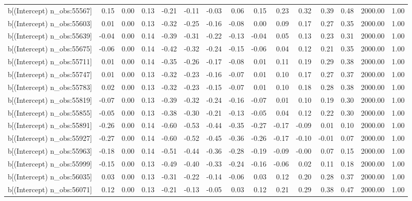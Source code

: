 \begin{table}[ht]
\begin{tabular}{rrrrrrrrrrrrrrr}
  b[(Intercept) n\_obs:55567] & 0.15 & 0.00 & 0.13 & -0.21 & -0.11 & -0.03 & 0.06 & 0.15 & 0.23 & 0.32 & 0.39 & 0.48 & 2000.00 & 1.00 \\ 
  b[(Intercept) n\_obs:55603] & 0.01 & 0.00 & 0.13 & -0.32 & -0.25 & -0.16 & -0.08 & 0.00 & 0.09 & 0.17 & 0.27 & 0.35 & 2000.00 & 1.00 \\ 
  b[(Intercept) n\_obs:55639] & -0.04 & 0.00 & 0.14 & -0.39 & -0.31 & -0.22 & -0.13 & -0.04 & 0.05 & 0.13 & 0.23 & 0.31 & 2000.00 & 1.00 \\ 
  b[(Intercept) n\_obs:55675] & -0.06 & 0.00 & 0.14 & -0.42 & -0.32 & -0.24 & -0.15 & -0.06 & 0.04 & 0.12 & 0.21 & 0.35 & 2000.00 & 1.00 \\ 
  b[(Intercept) n\_obs:55711] & 0.01 & 0.00 & 0.14 & -0.35 & -0.26 & -0.17 & -0.08 & 0.01 & 0.11 & 0.19 & 0.29 & 0.38 & 2000.00 & 1.00 \\ 
  b[(Intercept) n\_obs:55747] & 0.01 & 0.00 & 0.13 & -0.32 & -0.23 & -0.16 & -0.07 & 0.01 & 0.10 & 0.17 & 0.27 & 0.37 & 2000.00 & 1.00 \\ 
  b[(Intercept) n\_obs:55783] & 0.02 & 0.00 & 0.13 & -0.32 & -0.23 & -0.15 & -0.07 & 0.01 & 0.10 & 0.18 & 0.28 & 0.38 & 2000.00 & 1.00 \\ 
  b[(Intercept) n\_obs:55819] & -0.07 & 0.00 & 0.13 & -0.39 & -0.32 & -0.24 & -0.16 & -0.07 & 0.01 & 0.10 & 0.19 & 0.30 & 2000.00 & 1.00 \\ 
  b[(Intercept) n\_obs:55855] & -0.05 & 0.00 & 0.13 & -0.38 & -0.30 & -0.21 & -0.13 & -0.05 & 0.04 & 0.12 & 0.22 & 0.30 & 2000.00 & 1.00 \\ 
  b[(Intercept) n\_obs:55891] & -0.26 & 0.00 & 0.14 & -0.60 & -0.53 & -0.44 & -0.35 & -0.27 & -0.17 & -0.09 & 0.01 & 0.10 & 2000.00 & 1.00 \\ 
  b[(Intercept) n\_obs:55927] & -0.27 & 0.00 & 0.14 & -0.60 & -0.52 & -0.45 & -0.36 & -0.26 & -0.17 & -0.10 & -0.01 & 0.07 & 2000.00 & 1.00 \\ 
  b[(Intercept) n\_obs:55963] & -0.18 & 0.00 & 0.14 & -0.51 & -0.44 & -0.36 & -0.28 & -0.19 & -0.09 & -0.00 & 0.07 & 0.15 & 2000.00 & 1.00 \\ 
  b[(Intercept) n\_obs:55999] & -0.15 & 0.00 & 0.13 & -0.49 & -0.40 & -0.33 & -0.24 & -0.16 & -0.06 & 0.02 & 0.11 & 0.18 & 2000.00 & 1.00 \\ 
  b[(Intercept) n\_obs:56035] & 0.03 & 0.00 & 0.13 & -0.31 & -0.22 & -0.14 & -0.06 & 0.03 & 0.12 & 0.20 & 0.28 & 0.37 & 2000.00 & 1.00 \\ 
  b[(Intercept) n\_obs:56071] & 0.12 & 0.00 & 0.13 & -0.21 & -0.13 & -0.05 & 0.03 & 0.12 & 0.21 & 0.29 & 0.38 & 0.47 & 2000.00 & 1.00 \\ 

\end{tabular}
\end{table}
